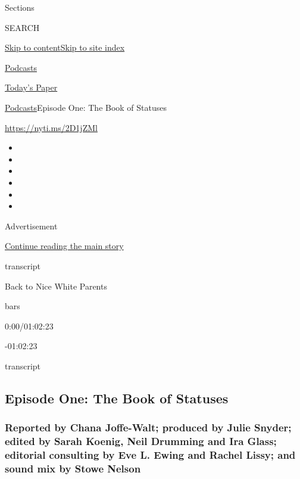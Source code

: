 Sections

SEARCH

\protect\hyperlink{site-content}{Skip to
content}\protect\hyperlink{site-index}{Skip to site index}

\href{https://www.nytimes3xbfgragh.onion/spotlight/podcasts}{Podcasts}

\href{https://myaccount.nytimes3xbfgragh.onion/auth/login?response_type=cookie\&client_id=vi}{}

\href{https://www.nytimes3xbfgragh.onion/section/todayspaper}{Today's
Paper}

\href{/spotlight/podcasts}{Podcasts}\textbar{}Episode One: The Book of
Statuses

\url{https://nyti.ms/2D1jZMl}

\begin{itemize}
\item
\item
\item
\item
\item
\item
\end{itemize}

Advertisement

\protect\hyperlink{after-top}{Continue reading the main story}

transcript

Back to Nice White Parents

bars

0:00/01:02:23

-01:02:23

transcript

\hypertarget{episode-one-the-book-of-statuses}{%
\subsection{Episode One: The Book of
Statuses}\label{episode-one-the-book-of-statuses}}

\hypertarget{reported-by-chana-joffe-walt-produced-by-julie-snyder-edited-by-sarah-koenig-neil-drumming-and-ira-glass-editorial-consulting-by-eve-l-ewing-and-rachel-lissy-and-sound-mix-by-stowe-nelson}{%
\subsubsection{Reported by Chana Joffe-Walt; produced by Julie Snyder;
edited by Sarah Koenig, Neil Drumming and Ira Glass; editorial
consulting by Eve L. Ewing and Rachel Lissy; and sound mix by Stowe
Nelson}\label{reported-by-chana-joffe-walt-produced-by-julie-snyder-edited-by-sarah-koenig-neil-drumming-and-ira-glass-editorial-consulting-by-eve-l-ewing-and-rachel-lissy-and-sound-mix-by-stowe-nelson}}

